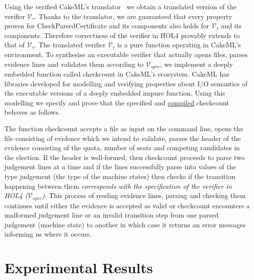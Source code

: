 \documentclass[10pt,conference]{IEEEtran}
\begin{document}
Using the verified CakeML's translator~\cite{cake} we obtain a translated version of the verifier $\mathcal{V}_{\tau}$. Thanks to the translator, we are guaranteed that every property proven for  
 Check\textunderscore{}Parsed\textunderscore{}Certificate and its components also holds for $\mathcal{V}_{\tau}$ and its components. Therefore correctness of the verifier in HOL4 provably extends to that of $\mathcal{V}_{\tau}$. The translated verifier $\mathcal{V}_{\tau}$ is a pure function operating in CakeML's environment. To synthesise an executable verifier that actually opens files, parses evidence lines and validates them according to $\mathcal{V}_{spec}$, we implement a deeply embedded function called check\textunderscore{}count in CakeML's ecosystem.  CakeML has  libraries developed for modelling and verifying properties about I/O semantics of the executable versions  of a deeply embedded impure function.  Using this modelling we specify and prove that the specified and \underline{compiled} check\textunderscore{}count behaves as follows. 
 
 The function check\textunderscore{}count accepts a file as input on the command line, opens the file consisting of  evidence which we intend to validate, parses the header of the evidence consisting of the quota, number of seats and competing candidates in the election. If the header is well-formed, then check\textunderscore{}count proceeds to parse two judgement lines at a time and if the lines  successfully parse into  values of the type judgement (the type of the machine states) then checks if  the transition happening between them \emph{corresponds with the specification of the verifier in HOL4 ($\mathcal{V}_{spec}$)}. This process of reading evidence lines, parsing and checking them continues until either the evidence is accepted as valid or  check\textunderscore{}count encounters a malformed judgement line or an invalid transition step from one parsed judgement (machine state) to another  in which case it returns an error messages  informing us where it occurs.  
 
\section{Experimental Results}
\end{document}
